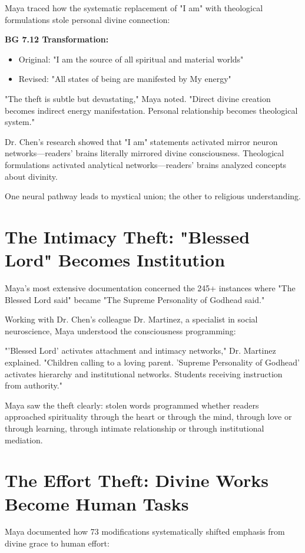 \documentclass[11pt,twoside]{book}
\begin{document}
Maya traced how the systematic replacement of "I am" with theological formulations stole personal divine connection:

\textbf{\textbf{BG 7.12 Transformation:}}
\begin{itemize}
\item Original: "I am the source of all spiritual and material worlds"
\item Revised: "All states of being are manifested by My energy"
\end{itemize}

"The theft is subtle but devastating," Maya noted. "Direct divine creation becomes indirect energy manifestation. Personal relationship becomes theological system."

Dr. Chen's research showed that "I am" statements activated mirror neuron networks—readers' brains literally mirrored divine consciousness. Theological formulations activated analytical networks—readers' brains analyzed concepts about divinity.

One neural pathway leads to mystical union; the other to religious understanding.
\section*{The Intimacy Theft: "Blessed Lord" Becomes Institution}
\label{sec:org7503213}

Maya's most extensive documentation concerned the 245+ instances where "The Blessed Lord said" became "The Supreme Personality of Godhead said."

Working with Dr. Chen's colleague Dr. Martinez, a specialist in social neuroscience, Maya understood the consciousness programming:

"'Blessed Lord' activates attachment and intimacy networks," Dr. Martinez explained. "Children calling to a loving parent. 'Supreme Personality of Godhead' activates hierarchy and institutional networks. Students receiving instruction from authority."

Maya saw the theft clearly: stolen words programmed whether readers approached spirituality through the heart or through the mind, through love or through learning, through intimate relationship or through institutional mediation.
\section*{The Effort Theft: Divine Works Become Human Tasks}
\label{sec:orgaa01ab4}

Maya documented how 73 modifications systematically shifted emphasis from divine grace to human effort:
\end{document}
